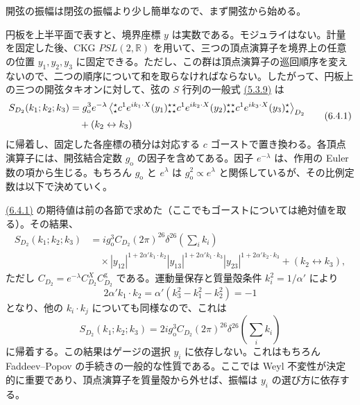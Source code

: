 \label{sec:6.4}

開弦の振幅は閉弦の振幅より少し簡単なので、まず開弦から始める。

円板を上半平面で表すと、境界座標 $y$ は実数である。モジュライはない。計量を固定した後、CKG $PSL(2,\mathbb R)$ を用いて、三つの頂点演算子を境界上の任意の位置 $y_1,y_2,y_3$ に固定できる。ただし、この群は頂点演算子の巡回順序を変えないので、二つの順序について和を取らなければならない。したがって、円板上の三つの開弦タキオンに対して、弦の $S$ 行列の一般式 \hyperref[eq:5.3.9]{(5.3.9)} は
\begin{equation}
\begin{aligned}
S_{D_2}(k_1;k_2;k_3)&=g_{\mathrm o}^3e^{-\lambda}
\left\langle\mathopen{{}^{\star}_{\star}}c^1e^{ik_1\cdot X}(y_1)\mathclose{{}^{\star}_{\star}}
\mathopen{{}^{\star}_{\star}}c^1e^{ik_2\cdot X}(y_2)\mathclose{{}^{\star}_{\star}}
\mathopen{{}^{\star}_{\star}}c^1e^{ik_3\cdot X}(y_3)\mathclose{{}^{\star}_{\star}}\right\rangle_{D_2}\\
&\quad+(k_2\leftrightarrow k_3)
\end{aligned}
\tag{6.4.1}\label{eq:6.4.1}
\end{equation}
に帰着し、固定した各座標の積分は対応する $c$ ゴーストで置き換わる。各頂点演算子には、開弦結合定数 $g_{\mathrm o}$ の因子を含めてある。因子 $e^{-\lambda}$ は、作用の Euler 数の項から生じる。もちろん $g_{\mathrm o}$ と $e^\lambda$ は $g_{\mathrm o}^2\propto e^\lambda$ と関係しているが、その比例定数は以下で決めていく。

\hyperref[eq:6.4.1]{(6.4.1)} の期待値は前の各節で求めた（ここでもゴーストについては絶対値を取る）。その結果、
\begin{equation}
\begin{aligned}
S_{D_2}(k_1;k_2;k_3)&=ig_{\mathrm o}^3C_{D_2}(2\pi)^{26}\delta^{26}\!\left(\sum_i k_i\right)\\
&\quad\times|y_{12}|^{1+2\alpha'k_1\cdot k_2}
|y_{13}|^{1+2\alpha'k_1\cdot k_3}|y_{23}|^{1+2\alpha'k_2\cdot k_3}
+(k_2\leftrightarrow k_3),
\end{aligned}
\tag{6.4.2}\label{eq:6.4.2}
\end{equation}
ただし $C_{D_2}=e^{-\lambda}C_{D_2}^XC_{D_2}^{\mathrm g}$ である。運動量保存と質量殻条件 $k_i^2=1/\alpha'$ により
\begin{equation}
2\alpha'k_1\cdot k_2=\alpha'(k_3^2-k_1^2-k_2^2)=-1
\tag{6.4.3}\label{eq:6.4.3}
\end{equation}
となり、他の $k_i\cdot k_j$ についても同様なので、これは
\begin{equation}
S_{D_2}(k_1;k_2;k_3)=2ig_{\mathrm o}^3C_{D_2}(2\pi)^{26}\delta^{26}\!\left(\sum_i k_i\right)
\tag{6.4.4}\label{eq:6.4.4}
\end{equation}
に帰着する。この結果はゲージの選択 $y_i$ に依存しない。これはもちろん Faddeev--Popov の手続きの一般的な性質である。ここでは Weyl 不変性が決定的に重要であり、頂点演算子を質量殻から外せば、振幅は $y_i$ の選び方に依存する。

